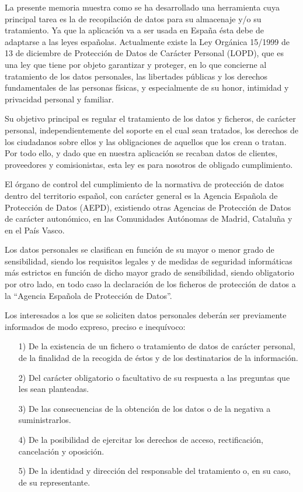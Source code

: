 La presente memoria muestra como se ha desarrollado una herramienta cuya
principal tarea es la de recopilación de datos para su almacenaje y/o su
tratamiento. Ya que la aplicación va a ser usada en España ésta debe de
adaptarse a las leyes españolas. Actualmente existe la Ley Orgánica 15/1999 de
13 de diciembre de Protección de Datos de Carácter Personal (LOPD), que es una
ley que tiene por objeto garantizar y proteger, en lo que concierne al
tratamiento de los datos personales, las libertades públicas y los derechos
fundamentales de las personas físicas, y especialmente de su honor, intimidad y
privacidad personal y familiar. 

Su objetivo principal es regular el tratamiento
de los datos y ficheros, de carácter personal, independientemente del soporte en
el cual sean tratados, los derechos de los ciudadanos sobre ellos y
las obligaciones de aquellos que los crean o tratan. Por todo ello, y dado que
en nuestra aplicación se recaban datos de clientes, proveedores y comisionistas,
esta ley es para nosotros de obligado cumplimiento. 

El órgano de control del
cumplimiento de la normativa de protección de datos dentro del territorio
español, con carácter general es la Agencia Española de Protección de
Datos (AEPD), existiendo otras Agencias de Protección de Datos de
carácter autonómico, en las Comunidades Autónomas de Madrid, Cataluña y en el
País Vasco. 

Los datos personales se clasifican en función de su mayor o menor
grado de sensibilidad, siendo los requisitos legales y de medidas de seguridad
informáticas más estrictos en función de dicho mayor grado de sensibilidad,
siendo obligatorio por otro lado, en todo caso la declaración de los ficheros de
protección de datos a la ``Agencia Española de Protección de Datos''. 

Los interesados a los que se soliciten datos personales deberán ser previamente
informados de modo expreso, preciso e inequívoco:

\begin{itemize}
\item[1)] De la existencia de un fichero o tratamiento de datos de carácter
personal, de la finalidad de la recogida de éstos y de los destinatarios de la
información.

\item[2)] Del carácter obligatorio o facultativo de su respuesta a las preguntas
que les sean planteadas.

\item[3)] De las consecuencias de la obtención de los datos o de la negativa a
suministrarlos.

\item[4)]De la posibilidad de ejercitar los derechos de acceso, rectificación,
cancelación y oposición.

\item[5)] De la identidad y dirección del responsable del tratamiento o, en su
caso, de su representante.
\end{itemize}

